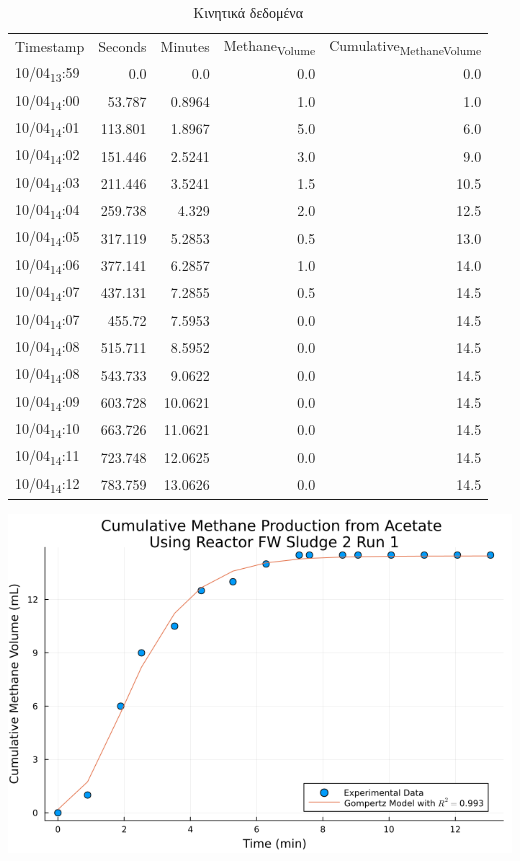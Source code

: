 \documentclass[11pt]{article}
\begin{document}
\begin{table}[htbp]
\caption{Κινητικά δεδομένα}
\centering
\begin{tabular}{lrrrr}
Timestamp & Seconds & Minutes & Methane\textsubscript{Volume} & Cumulative\textsubscript{Methane}\textsubscript{Volume}\\[0pt]
10/04\textsubscript{13}:59 & 0.0 & 0.0 & 0.0 & 0.0\\[0pt]
10/04\textsubscript{14}:00 & 53.787 & 0.8964 & 1.0 & 1.0\\[0pt]
10/04\textsubscript{14}:01 & 113.801 & 1.8967 & 5.0 & 6.0\\[0pt]
10/04\textsubscript{14}:02 & 151.446 & 2.5241 & 3.0 & 9.0\\[0pt]
10/04\textsubscript{14}:03 & 211.446 & 3.5241 & 1.5 & 10.5\\[0pt]
10/04\textsubscript{14}:04 & 259.738 & 4.329 & 2.0 & 12.5\\[0pt]
10/04\textsubscript{14}:05 & 317.119 & 5.2853 & 0.5 & 13.0\\[0pt]
10/04\textsubscript{14}:06 & 377.141 & 6.2857 & 1.0 & 14.0\\[0pt]
10/04\textsubscript{14}:07 & 437.131 & 7.2855 & 0.5 & 14.5\\[0pt]
10/04\textsubscript{14}:07 & 455.72 & 7.5953 & 0.0 & 14.5\\[0pt]
10/04\textsubscript{14}:08 & 515.711 & 8.5952 & 0.0 & 14.5\\[0pt]
10/04\textsubscript{14}:08 & 543.733 & 9.0622 & 0.0 & 14.5\\[0pt]
10/04\textsubscript{14}:09 & 603.728 & 10.0621 & 0.0 & 14.5\\[0pt]
10/04\textsubscript{14}:10 & 663.726 & 11.0621 & 0.0 & 14.5\\[0pt]
10/04\textsubscript{14}:11 & 723.748 & 12.0625 & 0.0 & 14.5\\[0pt]
10/04\textsubscript{14}:12 & 783.759 & 13.0626 & 0.0 & 14.5\\[0pt]
\end{tabular}
\end{table}

\begin{center}
\includegraphics[width=.9\linewidth]{../plots/BMPs/Acetate/methane_kinetics_acet_test_fw_s2_min.png}
\end{center}
\end{document}
